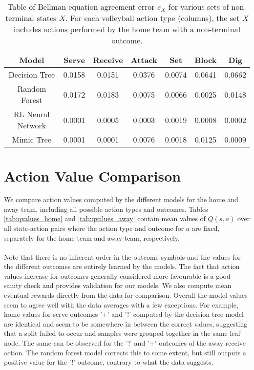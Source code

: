 \documentclass{sfuthesis}
\begin{document}
	\begin{table}
		\centering
		\begin{tabular}{c|cccccc}
			\textbf{Model}    & \textbf{Serve} & \textbf{Receive} & \textbf{Attack} & \textbf{Set} & \textbf{Block} & \textbf{Dig} \\ \hline
			Decision Tree     & 0.0158                  & 0.0151                    & 0.0376                   & 0.0074                & 0.0641                  & 0.0662                \\
			Random Forest     & 0.0172                  & 0.0183                    & 0.0075                   & 0.0066                & 0.0025                  & 0.0148                \\
			RL Neural Network & 0.0001                  & 0.0005                    & 0.0003                   & 0.0019                & 0.0008                  & 0.0002                \\
			Mimic Tree        & 0.0001                  & 0.0001                    & 0.0076                   & 0.0018                & 0.0125                  & 0.0009               
		\end{tabular}
		\caption{Table of Bellman equation agreement error $e_X$ for various sets of non-terminal states $X$. For each volleyball action type (columns), the set $X$ includes actions performed by the home team with a non-terminal outcome.}
		\label{tab:bellman-agreement}
	\end{table}
	
	\section{Action Value Comparison}
	
	We compare action values computed by the different models for the home and away team, including all possible action types and outcomes. Tables \ref{tab:qvalues_home} and \ref{tab:qvalues_away} contain mean values of $Q(s,a)$ over all state-action pairs where the action type and outcome for $a$ are fixed, separately for the home team and away team, respectively.\\\\
	Note that there is no inherent order in the outcome symbols and the values for the different outcomes are entirely learned by the models. The fact that action values increase for outcomes generally considered more favourable is a good sanity check and provides validation for our models. We also compute mean eventual rewards directly from the data for comparison. Overall the model values seem to agree well with the data averages with a few exceptions. For example, home values for serve outcomes '+' and '!' computed by the decision tree model are identical and seem to be somewhere in between the correct values, suggesting that a split failed to occur and samples were grouped together in the same leaf node. The same can be observed for the '!' and '+' outcomes of the away receive action. The random forest model corrects this to some extent, but still outputs a positive value for the '!' outcome, contrary to what the data suggests.
	
\end{document}
